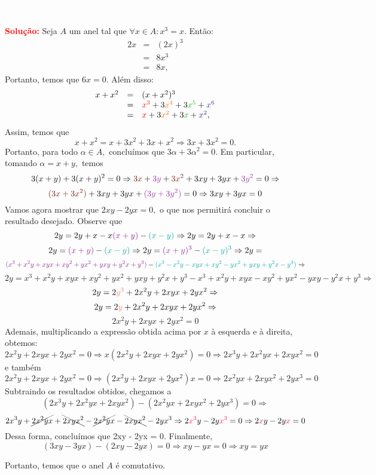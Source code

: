 \documentclass[11pt,a4paper]{article}
\newcommand{\solucao}[1]{
\textbf{\textcolor{white}{oi}\\ \\ \textcolor{red}{Solução:}} #1}
\begin{document}
\solucao{
Seja $A$ um anel tal que $\forall x\in A:x^3=x$. Então:
\[
\begin{array}{rcl}
2x&=&(2x)^3\\&=&8x^3\\&=&8x,
\end{array}
\]
Portanto, temos que $6x = 0.$ Além disso:
\[
\begin{array}{rcl}
x+x^2&=&(x+x^2)^3\\&=&\textcolor{red}{x^3}+3\textcolor{Laranja}{x^4}+3\textcolor{Verde}{x^5}+\textcolor{Blue}{x^6}\\&=&\textcolor{red}{x}+3\textcolor{Laranja}{x^2}+3\textcolor{Verde}{x}+\textcolor{Blue}{x^2},
\end{array}
\]
Assim, temos que
\[
x + x^2 = x + 3x^2 + 3x + x^2 \Rightarrow 3x+3x^2=0.
\]
Portanto, para todo $\alpha \in A,$ concluímos que $3\alpha + 3\alpha^2 = 0.$ Em particular, tomando $\alpha = x + y,$ temos
\[
3(x+y) + 3(x+y)^2 = 0 \Rightarrow \textcolor{Brown}{3x}+\textcolor{Purple}{3y}+\textcolor{Brown}{3x^2} + 3xy + 3yx + \textcolor{Purple}{3y^2} = 0 \Rightarrow\]\[ \textcolor{Brown}{(3x + 3x^2)} + 3xy + 3yx + \textcolor{Purple}{(3y + 3y^2)} = 0 \Rightarrow 3xy + 3yx = 0
\]
Vamos agora mostrar que $2xy - 2yx = 0,$ o que nos permitirá concluir o resultado desejado. Observe que
\[
2y = 2y + x - x  \textcolor{Fuchsia}{(x+y)} - \textcolor{Emerald}{(x-y)} \Rightarrow 2y = 2y + x - x  \Rightarrow \]\[
2y = \textcolor{Fuchsia}{(x+y)} - \textcolor{Emerald}{(x-y)} \Rightarrow 
2y = \textcolor{Fuchsia}{(x+y)^3} - \textcolor{Emerald}{(x-y)^3} \Rightarrow
2y = \]\[\textcolor{Fuchsia}{(x^3 + x^2y+xyx + xy^2 + yx^2 + yxy + y^2 x + y^3)} - \textcolor{Emerald}{(x^3 - x^2y-xyx + xy^2 - yx^2 + yxy + y^2 x - y^3)} \Rightarrow \]\[
2y = x^3 + x^2y+xyx + xy^2 + yx^2 + yxy + y^2 x + y^3 - x^3 + x^2y+xyx - xy^2 + yx^2 - yxy - y^2 x + y^3  \Rightarrow \]\[2y = 2\textcolor{Salmon}{y^3}+2x^2y+2xyx+2yx^2 \Rightarrow
\]
\[
2y = 2\textcolor{Salmon}{y}+2x^2y+2xyx+2yx^2 \Rightarrow
\]
\[
2x^2y+2xyx+2yx^2=0
\]
Ademais, multiplicando a expressão obtida acima por $x$ à esquerda e à direita, obtemos: 
\[
2x^2y+2xyx+2yx^2=0 \Rightarrow x(2x^2y+2xyx+2yx^2) = 0 \Rightarrow 2x^3y+2x^2yx+2xyx^2=0
\]
e também
\[
2x^2y+2xyx+2yx^2=0 \Rightarrow (2x^2y+2xyx+2yx^2)x = 0 \Rightarrow 2x^2yx +2xyx^2 + 2yx^3 = 0
\]
Subtraindo os resultados obtidos, chegamos a
\[
(2x^3y+2x^2yx+2xyx^2) - (2x^2yx +2xyx^2 + 2yx^3 ) = 0 \Rightarrow \]\[ 2x^3y+ \cancel{2x^2yx}+\bcancel{2xyx^2} - \cancel{2x^2yx} - \bcancel{2xyx^2} - 2yx^3 \Rightarrow 2\textcolor{WildStrawberry}{x^3}y-2y\textcolor{WildStrawberry}{x^3}=0 \Rightarrow 2\textcolor{WildStrawberry}{x}y-2y\textcolor{WildStrawberry}{x}=0
\]
Dessa forma, concluímos que 2xy - 2yx = 0. Finalmente, 
\[
(3xy - 3yx) - (2xy - 2yx) = 0 \Rightarrow xy - yx = 0 \Rightarrow \boxed{xy = yx}
\]

Portanto, temos que o anel $A$ é comutativo.
}
\end{document}
